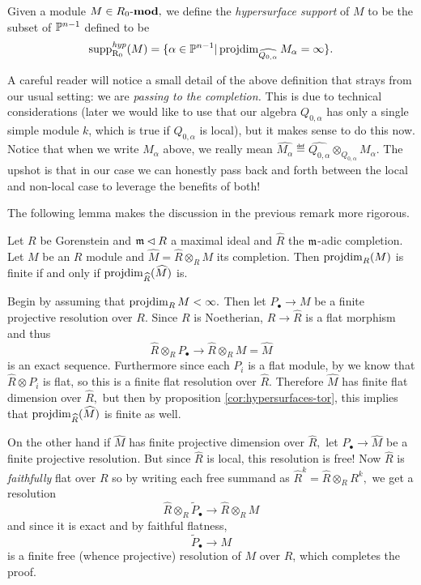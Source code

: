 \documentclass [11pt, proquest] {uwthesis}[2020/02/24]
\DeclareMathOperator{\supphRnaught}{supp^\mathit{hyp}_{R_0}}
\begin{document}
    \begin{defn}\label{defn:hyp-support}
        Given a module $M\in R_0\text{-}\mathbf{mod},$ we define the \emph{hypersurface support} of $M$ to be the subset of $\mathbb{P}^{n-1}$ defined to be
        \[\supphRnaught(M)=\{\alpha\in \bbP^{n-1}|\projdim_{\widehat{Q_{0,\alpha}}}M_\alpha = \infty\}.\]
    \end{defn}
    
    \begin{rmk} 
        A careful reader will notice a small detail of the above definition that strays from our usual setting: we are \textit{passing to the completion.} This is due to technical considerations (later we would like to use that our algebra $Q_{0,\alpha}$ has only a single simple module $k$, which is true if $Q_{0,\alpha}$ is local), but it makes sense to do this now. Notice that when we write $M_\alpha$ above, we really mean $\widehat{M_\alpha}\eqdef \widehat{Q_{0,\alpha}}\otimes_{Q_{0,\alpha}}M_\alpha.$ The upshot is that in our case we can honestly pass back and forth between the local and non-local case to leverage the benefits of both!
    \end{rmk}
    The following lemma makes the discussion in the previous remark more rigorous.
    \begin{lem}\label{lem:projdim-completion}
        Let $R$ be Gorenstein and $\mathfrak{m}\lhd R$ a maximal ideal and $\widehat R$ the $\mathfrak{m}$-adic completion. Let $M$ be an $R$ module and $\widehat M=\widehat R\otimes_R M$ its completion. Then $\operatorname{projdim}_R(M)$ is finite if and only if $\operatorname{projdim}_{\widehat R}(\widehat M)$ is.
    \end{lem}
    \begin{prf}
        Begin by assuming that $\operatorname{projdim}_R M<\infty.$ Then let $P_\bullet\to M$ be a finite projective resolution over $R$. Since $R$ is Noetherian, $R\to \widehat R$ is a flat morphism and thus
        \[\widehat{R}\otimes_R P_\bullet \to \widehat{R}\otimes_R M=\widehat M\]
        is an exact sequence. Furthermore since each $P_i$ is a flat module, by \cite[\href{https://stacks.math.columbia.edu/tag/00HI}{Tag 00HI}]{stacks-project} we know that $\widehat R\otimes P_i$ is flat, so this is a finite flat resolution over $\widehat{R}$. Therefore $\widehat M$ has finite flat dimension over $\widehat{R},$ but then by proposition \ref{cor:hypersurfaces-tor}, this implies that $\operatorname{projdim}_{\widehat R}(\widehat M)$ is finite as well.
        
        On the other hand if $\widehat M$ has finite projective dimension over $\widehat R,$ let $P_\bullet\to \widehat M$ be a finite projective resolution. But since $\widehat R$ is local, this resolution is free! Now $\widehat{R}$ is \textit{faithfully} flat over $R$ so by writing each free summand as $\widehat R^k=\widehat R\otimes_R R^k,$ we get a resolution
        \[\widehat R\otimes_R \tilde P_\bullet\to \widehat R\otimes_R M\]
        and since it is exact and by faithful flatness,
        \[\tilde P_\bullet\to M\]
        is a finite free (whence projective) resolution of $M$ over $R$, which completes the proof.
    \end{prf}
\end{document}
